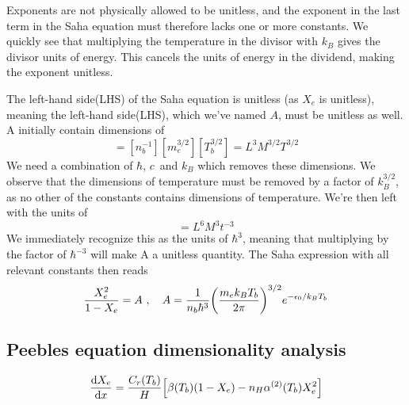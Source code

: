 \documentclass[10pt, a4paper]{article}
\begin{document}
Exponents are not physically allowed to be unitless, and the exponent in the last term in the Saha equation must therefore lacks one or more constants. We quickly see that multiplying the temperature in the divisor with $k_B$ gives the divisor units of energy. This cancels the units of energy in the dividend, making the exponent unitless.

The left-hand side(LHS) of the Saha equation is unitless (as $X_e$ is unitless), meaning the left-hand side(LHS), which we've named $A$, must be unitless as well. A initially contain dimensions of
\begin{equation*}
    [A] = [n_b^{-1}][m_e^{3/2}][T_b^{3/2}] = L^3M^{3/2}T^{3/2}
\end{equation*}
We need a combination of $\hbar$, $c$ and $k_B$ which removes these dimensions. We observe that the dimensions of temperature must be removed by a factor of $k_B^{3/2}$, as no other of the constants contains dimensions of temperature. We're then left with the units of
\begin{equation*}
    [A][k_B^{3/2}] = L^6M^3t^{-3}
\end{equation*}
We immediately recognize this as the units of $\hbar^3$, meaning that multiplying by the factor of $\hbar^{-3}$ will make A a unitless quantity. The Saha expression with all relevant constants then reads
\begin{equation}\label{eqn:Saha}
    \frac{X_{e}^{2}}{1-X_{e}} = A\ , \quad A = \frac{1}{n_{b}\hbar^3}\qty(\frac{m_{e} k_B T_{b}}{2 \pi})^{3 / 2} e^{-\epsilon_{0} / k_B T_{b}}
\end{equation}


\subsection{Peebles equation dimensionality analysis}

\begin{equation}
    \label{eqn:Peebles}
    \dv{X_{e}}{x}=\frac{C_{r}\qty(T_{b})}{H}\qty[\beta\qty(T_{b})\qty(1-X_{e})-n_{H} \alpha^{(2)}\qty(T_{b}) X_{e}^{2}]
\end{equation}
\end{document}
